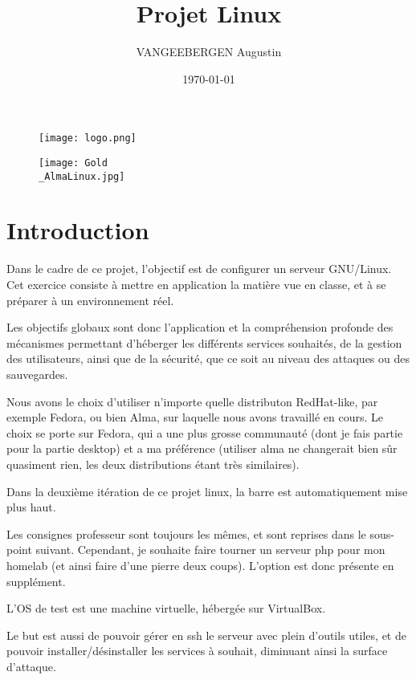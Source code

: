 \documentclass{article}
\title{Projet Linux}
\author{VANGEEBERGEN Augustin}
\date{\today}
\begin{document}
	
	\maketitle
	
	\begin{figure}[h]
		\centering
		\texttt{[image: logo.png]}
		\label{fig:logoheh}
	\end{figure}
	
	\begin{figure}[h!]
		\centering
		\texttt{[image: Gold\\\_AlmaLinux.jpg]}
		\label{fig:logoheh}
	\end{figure}
	

	
	\newpage


	\tableofcontents
	\newpage
	

	
\section{Introduction}
Dans le cadre de ce projet, l'objectif est de configurer un serveur GNU/Linux. Cet exercice consiste à mettre en application la matière vue en classe, et à se préparer à un environnement réel.
	
Les objectifs globaux sont donc l'application et la compréhension profonde des mécanismes permettant d'héberger les différents services souhaités, de la gestion des utilisateurs, ainsi que de la sécurité, que ce soit au niveau des attaques ou des sauvegardes.

Nous avons le choix d'utiliser n'importe quelle distributon RedHat-like, par exemple Fedora, ou bien Alma, sur laquelle nous avons travaillé en cours.
Le choix se porte sur Fedora, qui a une plus grosse communauté (dont je fais partie pour la partie desktop) et a ma préférence (utiliser alma ne changerait bien sûr quasiment rien, les deux distributions étant très similaires).

Dans la deuxième itération de ce projet linux, la barre est automatiquement mise plus haut.
	
Les consignes professeur sont toujours les mêmes, et sont reprises dans le sous-point suivant. Cependant, je souhaite faire tourner un serveur php pour mon homelab (et ainsi faire d'une pierre deux coups). L'option est donc présente en supplément.
	
L'OS de test est une machine virtuelle, hébergée sur VirtualBox. 
	
	Le but est aussi de pouvoir gérer en ssh le serveur avec plein d'outils utiles, et de pouvoir installer/désinstaller les services à souhait, diminuant ainsi la surface d'attaque.
	
\end{document}
